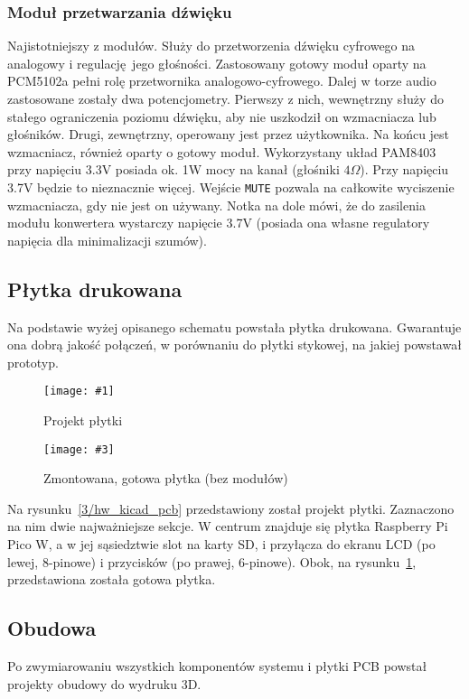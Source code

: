 \documentclass[12pt]{report}
\newcommand{\imgintss}[5]{
	\begin{figure}[{#5}]
		\centering
		\begin{minipage}{.45\textwidth}
			\centering
			\texttt{[image: \#1]}
			\caption{#2}
			\label{#1}
		\end{minipage}%
		\hfill
		\begin{minipage}{.45\textwidth}
			\centering
			\texttt{[image: \#3]}
			\caption{#4}
			\label{#3}
		\end{minipage}
	\end{figure}
}
\newcommand{\imghss}[4]{\imgintss{#1}{#2}{#3}{#4}{H}}
\newcommand{\lstfile}[3]{
	\noindent
	\hspace{0.1\linewidth}
	\begin{minipage}{0.8\linewidth}
		
	\end{minipage}
	\vspace{0.3cm}
}
\begin{document}
			\subsubsection{Moduł przetwarzania dźwięku}
				Najistotniejszy z modułów. Służy do przetworzenia dźwięku cyfrowego na analogowy i regulację jego głośności. Zastosowany gotowy moduł\textsuperscript{\cite{hw_mod_dac}} oparty na PCM5102a pełni rolę przetwornika analogowo-cyfrowego. Dalej w torze audio zastosowane zostały dwa potencjometry. Pierwszy z nich, wewnętrzny służy do stałego ograniczenia poziomu dźwięku, aby nie uszkodził on wzmacniacza lub głośników. Drugi, zewnętrzny, operowany jest przez użytkownika. Na końcu jest wzmacniacz, również oparty o gotowy moduł\textsuperscript{\cite{hw_mod_amp}}. Wykorzystany układ PAM8403 przy napięciu 3.3V posiada ok. 1W mocy na kanał (głośniki $4 \Omega$). Przy napięciu 3.7V będzie to nieznacznie więcej. Wejście \lstinline|MUTE| pozwala na całkowite wyciszenie wzmacniacza, gdy nie jest on używany. Notka na dole mówi, że do zasilenia modułu konwertera wystarczy napięcie 3.7V (posiada ona własne regulatory napięcia dla minimalizacji szumów).
				
		\subsection{Płytka drukowana}
			Na podstawie wyżej opisanego schematu powstała płytka drukowana. Gwarantuje ona dobrą jakość połączeń, w porównaniu do płytki stykowej, na jakiej powstawał prototyp.
		
			\imghss{3/hw_kicad_pcb}{Projekt płytki}{3/hw_pcb}{Zmontowana, gotowa płytka (bez modułów)}
			
			Na rysunku~\ref{3/hw_kicad_pcb} przedstawiony został projekt płytki. Zaznaczono na nim dwie najważniejsze sekcje. W centrum znajduje się płytka Raspberry Pi Pico W, a w jej sąsiedztwie slot na karty SD, i przyłącza do ekranu LCD (po lewej, 8-pinowe) i przycisków (po prawej, 6-pinowe). Obok, na rysunku~\ref{3/hw_pcb}, przedstawiona została gotowa płytka.
			
		\subsection{Obudowa}
			Po zwymiarowaniu wszystkich komponentów systemu i płytki PCB powstał projekty obudowy do wydruku 3D.
			
			\lstfile{scad}{Kod generujący otwory na przyciski i śruby montażowe}{lst/3/buttons.scad}
			
\end{document}

